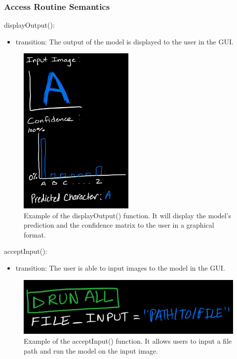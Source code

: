 \documentclass[12pt, titlepage]{article}
\begin{document}
\subsubsection{Access Routine Semantics}

\noindent displayOutput():
\begin{itemize}
\item transition: The output of the model is displayed to the user in the GUI.
\end{itemize}

\begin{figure}
\centering
\includegraphics[width=0.5\textwidth]{displayOutput.jpeg}
\caption{Example of the displayOutput() function. It will display the
  model's prediction and the confidence matrix to the user in a graphical
  format.}
\label{fig:displayOutput}
\end{figure}

\noindent acceptInput():
\begin{itemize}
\item transition: The user is able to input images to the model in the GUI.
\end{itemize}

\begin{figure}
  \centering
  \includegraphics[width=1\textwidth]{acceptInput.jpeg}
  \caption{Example of the acceptInput() function. It allows users to input a
  file path and run the model on the input image.}
  \label{fig:acceptInput}
  \end{figure}
\end{document}

